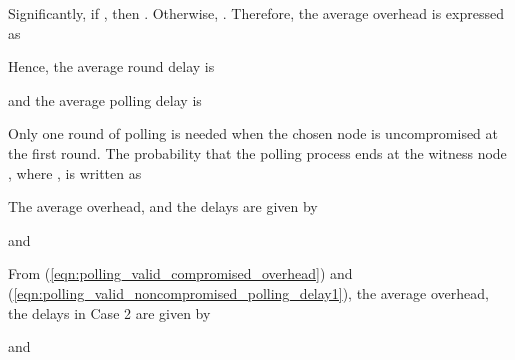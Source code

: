\documentclass[12pt, onecolumn, draftcls]{IEEEtran}
\begin{document}
Significantly, if , then . Otherwise, . Therefore, the average overhead is
expressed as

Hence, the average round delay is

and the average polling delay is

 Only one round of polling is needed when
the chosen node is uncompromised at the first round. The probability
that the polling process ends at the witness node , where , is written as

The average overhead, and the delays are given by


and


{From} (\ref{eqn:polling_valid_compromised_overhead}) and
(\ref{eqn:polling_valid_noncompromised_polling_delay1}), the average
overhead, the delays in Case 2 are given by


and
\end{document}
